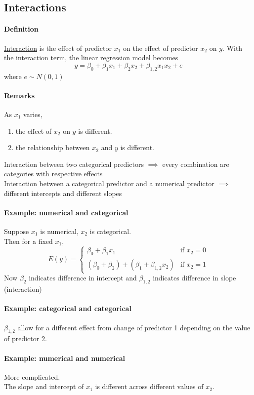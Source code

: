 \documentclass[11pt]{article}
\newcommand{\under}[1]{\underline{#1}}
\begin{document}
\subsection{Interactions}
\paragraph{Definition} \under{Interaction} is the effect of predictor $x_1$ on the effect of predictor $x_2$ on $y$. With the interaction term, the linear regression model becomes
$$y = \beta_0 + \beta_1x_1 + \beta_2 x_2 + \beta_{1,2}x_1x_2 + e$$
where $e \sim N(0,1)$
\paragraph{Remarks}
As $x_1$ varies, 
\begin{enumerate}
	\item the effect of $x_2$ on $y$ is different.
	\item the relationship between $x_2$ and $y$ is different.
\end{enumerate}
Interaction between two categorical predictors $\implies$ every combination are categories with respective effects\\
Interaction between a categorical predictor and a numerical predictor $\implies$ different intercepts and different slopes\\
\paragraph{Example: numerical and categorical}
Suppose $x_1$ is numerical, $x_2$ is categorical.\\
Then for a fixed $x_1$, 
$$E(y) = \begin{cases}
	\beta_0 + \beta_1x_1 & \text{if $x_2 = 0$} \\
	(\beta_0 + \beta_2) + (\beta_1 + \beta_{1,2}x_2) & \text{if $x_2 = 1$}
\end{cases}$$
Now $\beta_2$ indicates difference in intercept and $\beta_{1,2}$ indicates difference in slope (interaction)
\paragraph{Example: categorical and categorical}
$\beta_{1,2}$ allow for a different effect from change of predictor 1 depending on the value of predictor 2.
\paragraph{Example: numerical and numerical}
More complicated. \\
The slope and intercept of $x_1$ is different across different values of $x_2$.
\end{document}
